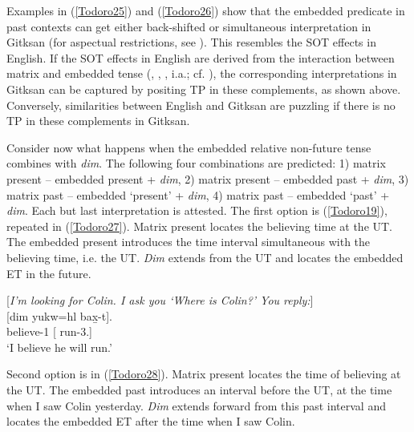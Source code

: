 \documentclass[output=paper]{langscibook}
\begin{document}
Examples in (\ref{Todoro25}) and (\ref{Todoro26}) show that the embedded predicate in past contexts can get either back-shifted or simultaneous interpretation in Gitksan (for aspectual restrictions, see \citealt{todorovic2020}). This resembles the SOT effects in English. If the SOT effects in English are derived from the interaction between matrix and embedded tense (\citealt{ogihara1995a}, \citealt{gronnstechow2010a}, \citealt{zeijlstra2012a}, i.a.; cf. \citealt{altshuler2012a}), the corresponding interpretations in Gitksan can be captured by positing TP
in these complements, as shown above. Conversely, similarities between English and Gitksan are puzzling if there is no TP  %
in these complements in Gitksan.  

Consider now what happens when the embedded relative non-future tense combines with \emph{dim}. The following four combinations are predicted: 1) matrix present – embedded present + \emph{dim}, 2) matrix present – embedded past + \emph{dim}, 3) matrix past – embedded ‘present’ + \emph{dim}, 4) matrix past – embedded ‘past’ + \emph{dim}. Each but last interpretation is attested.
The first option is (\ref{Todoro19}), repeated in (\ref{Todoro27}). Matrix present locates the believing time at the UT. The embedded present introduces the time interval simultaneous with the believing time, i.e. the UT. \emph{Dim} extends from the UT and locates the embedded ET in the future. 

\begin{exe}
\ex \label{Todoro27}
\begin{xlist}

\ex \label{Todoro27a} [\emph{I’m looking for Colin. I ask you ‘Where is Colin?’ You reply:}]\\
 	[{dim}	{yukw=hl}	{bax̱-t}].  \\
    believe-1	[		run-3.{\seriesII}] \\
\glt ‘I believe he will run.’ 

\ex \label{Todoro27b}

\end{xlist}
\end{exe}

Second option is in (\ref{Todoro28}). Matrix present locates the time of believing at the UT. The embedded past introduces an interval before the UT, at the time when I saw Colin yesterday. \emph{Dim} extends forward from this past interval and locates the embedded ET after the time when I saw Colin.
\end{document}

